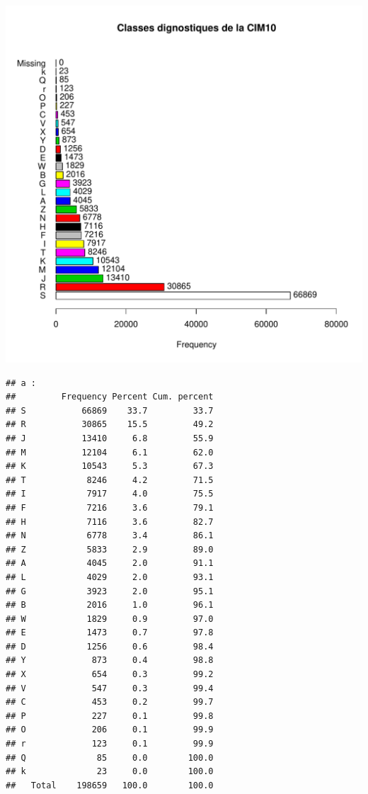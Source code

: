 \documentclass[12pt,english,french,twoside]{report}\usepackage[]{graphicx}\usepackage[]{color}
\makeatletter
\def\maxwidth{ %
  \ifdim\Gin@nat@width>\linewidth
    \linewidth
  \else
    \Gin@nat@width
  \fi
}
\newenvironment{kframe}{%
 \def\at@end@of@kframe{}%
 \ifinner\ifhmode%
  \def\at@end@of@kframe{\end{minipage}}%
  \begin{minipage}{\columnwidth}%
 \fi\fi%
 \def\FrameCommand##1{\hskip\@totalleftmargin \hskip-\fboxsep
 \colorbox{shadecolor}{##1}\hskip-\fboxsep
     \hskip-\linewidth \hskip-\@totalleftmargin \hskip\columnwidth}%
 \MakeFramed {\advance\hsize-\width
   \@totalleftmargin\z@ \linewidth\hsize
   \@setminipage}}%
 {\par\unskip\endMakeFramed%
 \at@end@of@kframe}
\newenvironment{knitrout}{}{} %
\makeatother
\begin{document}
\begin{knitrout}
\color{fgcolor}
\includegraphics[width=\maxwidth]{figure/class_cim10} 
\begin{kframe}\begin{verbatim}
## a :  
##         Frequency Percent Cum. percent
## S           66869    33.7         33.7
## R           30865    15.5         49.2
## J           13410     6.8         55.9
## M           12104     6.1         62.0
## K           10543     5.3         67.3
## T            8246     4.2         71.5
## I            7917     4.0         75.5
## F            7216     3.6         79.1
## H            7116     3.6         82.7
## N            6778     3.4         86.1
## Z            5833     2.9         89.0
## A            4045     2.0         91.1
## L            4029     2.0         93.1
## G            3923     2.0         95.1
## B            2016     1.0         96.1
## W            1829     0.9         97.0
## E            1473     0.7         97.8
## D            1256     0.6         98.4
## Y             873     0.4         98.8
## X             654     0.3         99.2
## V             547     0.3         99.4
## C             453     0.2         99.7
## P             227     0.1         99.8
## O             206     0.1         99.9
## r             123     0.1         99.9
## Q              85     0.0        100.0
## k              23     0.0        100.0
##   Total    198659   100.0        100.0
\end{verbatim}
\end{kframe}
\end{knitrout}
\end{document}
